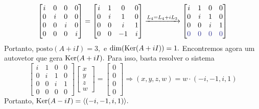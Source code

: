 \documentclass[11pt,a4paper]{article}
\begin{document}
{\begin{itemize}
\[\begin{bmatrix}
i & 0 & 0& 0\\
0 &i &0 & 0 \\
0 &0 &i& 0 \\
0 & 0 & 0&i
\end{bmatrix} = \begin{bmatrix}
i & 1 & 0& 0\\
0 &i &1 & 0 \\
0 &0 &i& 1 \\
0 & 0 & -1&i
\end{bmatrix} \xrightarrow[]{L_4 = L_4 +iL_3} \begin{bmatrix}
i & 1 & 0& 0\\
0 &i &1 & 0 \\
0 &0 &i& 1 \\
\textcolor{Blue}{0} & \textcolor{Blue}{0} & \textcolor{Blue}{0}& \textcolor{Blue}{0}
\end{bmatrix}
\]
Portanto, $\mbox{posto}(A + iI) = 3,$ e $\dim(\operatorname{Ker}(A + iI)) = 1.$ Encontremos agora um autovetor que gera $\operatorname{Ker}(A + iI).$ Para isso, basta resolver o sistema
\[
\begin{bmatrix}
i & 1 & 0& 0\\
0 &i &1 & 0 \\
0 &0 &i& 1 \\
0 & 0 &0& 0\end{bmatrix} \begin{bmatrix} x \\ y \\ z \\ w\end{bmatrix} = \begin{bmatrix} 0 \\ 0\\ 0 \\ 0\end{bmatrix}
\Rightarrow (x,y,z,w) = w \cdot (-i, -1, i, 1)\]
Portanto, $\operatorname{Ker}(A  - iI) = \langle (-i, -1, i, 1) \rangle.$
\end{itemize}

}
\end{document}
